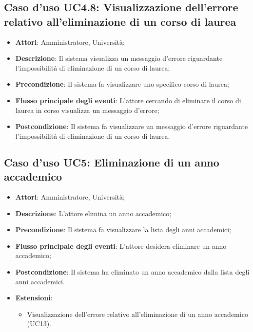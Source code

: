 \subsection{Caso d'uso \texorpdfstring{UC4.8}{UC4.8}: Visualizzazione dell'errore relativo all'eliminazione di un corso di laurea}
\begin{itemize}
	\item \textbf{Attori}: Amministratore, Università;
	\item \textbf{Descrizione}: Il sistema visualizza un messaggio d'errore riguardante l'impossibilità di eliminazione di un corso di laurea;
	
	\item \textbf{Precondizione}: Il sistema fa visualizzare uno specifico corso di laurea;
	
	
	\item \textbf{Flusso principale degli eventi}: L'attore cercando di eliminare il corso di laurea in corso visualizza un messaggio d'errore;
	
	\item \textbf{Postcondizione}: Il sistema fa visualizzare un messaggio d'errore riguardante l'impossibilità di eliminazione di un corso di laurea.
	
\end{itemize}
\subsection{Caso d'uso \texorpdfstring{UC5}{UC5}: Eliminazione di un anno accademico}
\begin{itemize}
	\item \textbf{Attori}: Amministratore, Università;
	\item \textbf{Descrizione}: L'attore elimina un anno accademico;
	\item \textbf{Precondizione}: Il sistema fa visualizzare la lista degli anni accademici;
	\item \textbf{Flusso principale degli eventi}: L'attore desidera eliminare un anno accademico;
	\item \textbf{Postcondizione}: Il sistema ha eliminato un anno accademico dalla lista degli anni accademici.
	
	\item \textbf{Estensioni}:
	\begin{itemize}
		\item Visualizzazione dell'errore relativo all'eliminazione di un anno accademico (UC13).
	\end{itemize}
\end{itemize}
